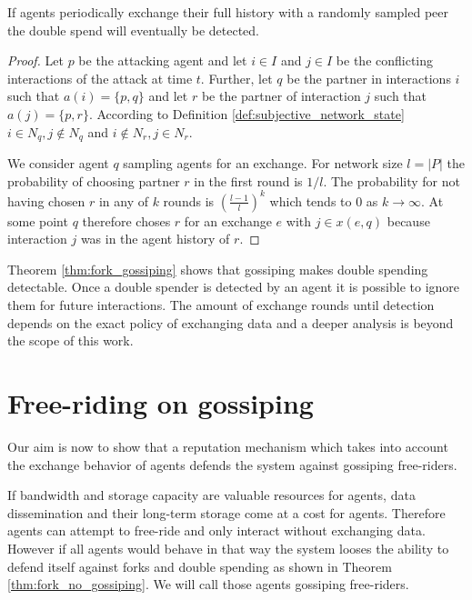 \begin{thm}
    \label{thm:fork_gossiping}
    If agents periodically exchange their full history with a randomly sampled peer the double spend
    will eventually be detected.
\end{thm}
\begin{proof}
    Let $p$ be the attacking agent and let $i \in I$ and $j \in I$ be the conflicting interactions 
    of the attack at time $t$. Further, let $q$ be the partner in interactions $i$ such that 
    $a(i) = \{p, q\}$ and let $r$ be the partner of interaction $j$ such that $a(j) = \{p, r\}$. 
    According to Definition \ref{def:subjective_network_state} $i \in N_{q}, j \notin N_{q}$ and 
    $i \notin N_{r}, j \in N_{r}$.

    We consider agent $q$ sampling agents for an exchange. For network size $l = |P|$ the probability of choosing partner $r$ in the first round is $1/l$. The probability for not having
    chosen $r$ in any of $k$ rounds is $(\frac{l-1}{l})^k$ which tends to 0 as $k \rightarrow \infty$.
    At some point $q$ therefore choses $r$ for an exchange $e$ with $j \in x(e, q)$ because
    interaction $j$ was in the agent history of $r$.
\end{proof}

Theorem \ref{thm:fork_gossiping} shows that gossiping makes double spending detectable. Once a double
spender is detected by an agent it is possible to ignore them for future interactions. The amount 
of exchange rounds until detection depends on the exact policy of exchanging data and a deeper 
analysis is beyond the scope of this work.

\section{Free-riding on gossiping}
Our aim is now to show that a reputation mechanism which takes into account the exchange behavior of 
agents defends the system against gossiping free-riders. 

If bandwidth and storage capacity are valuable resources for agents, data dissemination and their 
long-term storage come at a cost for agents. Therefore agents can attempt to free-ride and only 
interact without exchanging data. However if all agents would behave in that way the system looses 
the ability to defend itself against forks and double spending as shown in Theorem 
\ref{thm:fork_no_gossiping}. We will call those agents gossiping free-riders. 

